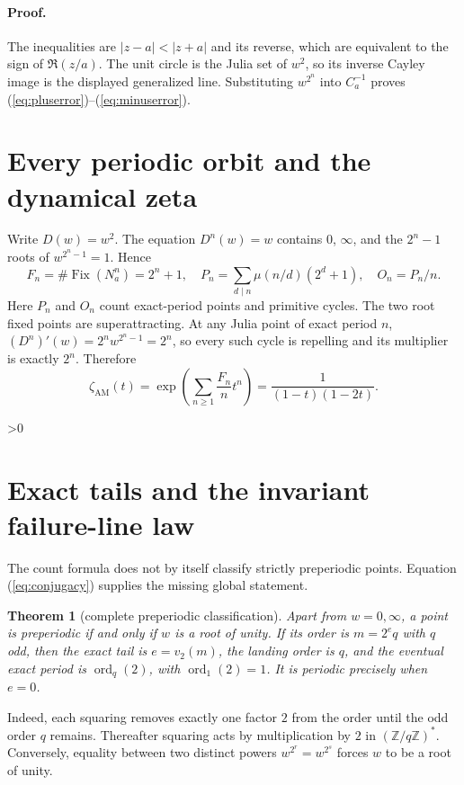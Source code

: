 \documentclass[10pt]{article}
\newtheorem{theorem}{Theorem}
\newcommand{\AM}{\mathrm{AM}}
\begin{document}
\paragraph{Proof.}
The inequalities are \(|z-a|<|z+a|\) and its reverse, which are equivalent
to the sign of \(\Re(z/a)\).  The unit circle is the Julia set of \(w^2\), so
its inverse Cayley image is the displayed generalized line.  Substituting
\(w^{2^n}\) into \(C_a^{-1}\) proves
(\ref{eq:pluserror})--(\ref{eq:minuserror}).

\section{Every periodic orbit and the dynamical zeta}
Write \(D(w)=w^2\).  The equation \(D^n(w)=w\) contains \(0\), \(\infty\),
and the \(2^n-1\) roots of \(w^{2^n-1}=1\).  Hence
\begin{equation}
 F_n=\#\operatorname{Fix}(N_a^n)=2^n+1,
 \quad P_n=\sum_{d\mid n}\mu(n/d)(2^d+1),
 \quad O_n=P_n/n.
 \label{eq:counts}
\end{equation}
Here \(P_n\) and \(O_n\) count exact-period points and primitive cycles.
The two root fixed points are superattracting.  At any Julia point of exact
period \(n\),
\((D^n)'(w)=2^n w^{2^n-1}=2^n\), so every such cycle is repelling and its
multiplier is exactly \(2^n\).  Therefore
\begin{equation}
 \zeta_{\AM}(t)=\exp\!\left(\sum_{n\ge1}\frac{F_n}{n}t^n\right)
 =\frac{1}{(1-t)(1-2t)}.
 \label{eq:zeta}
\end{equation}

\ifnum\CRevisionRound>0
\section{Exact tails and the invariant failure-line law}
The count formula does not by itself classify strictly preperiodic points.
Equation (\ref{eq:conjugacy}) supplies the missing global statement.
\begin{theorem}[complete preperiodic classification]
Apart from \(w=0,\infty\), a point is preperiodic if and only if \(w\) is a
root of unity.  If its order is
\(m=2^e q\) with \(q\) odd, then the exact tail is \(e=v_2(m)\), the landing
order is \(q\), and the eventual exact period is
\(\operatorname{ord}_q(2)\), with \(\operatorname{ord}_1(2)=1\).  It is
periodic precisely when \(e=0\).
\end{theorem}
Indeed, each squaring removes exactly one factor \(2\) from the order until
the odd order \(q\) remains.  Thereafter squaring acts by multiplication by
\(2\) in \((\mathbb Z/q\mathbb Z)^*\).  Conversely, equality between two
distinct powers \(w^{2^r}=w^{2^s}\) forces \(w\) to be a root of unity.
\end{document}
